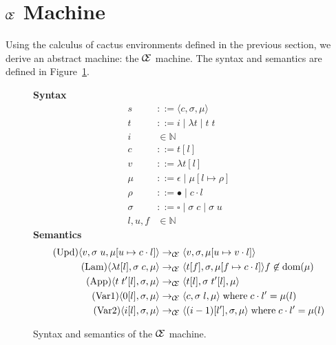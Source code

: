 \section{$\mathcal{\mathcal{C} \mskip -4mu \mathcal{E}}$ Machine} \label{sec:mach}

Using the calculus of cactus environments defined in the previous section, we
derive an abstract machine: the $\mathcal{\mathcal{C} \mskip -4mu \mathcal{E}}$ machine. The syntax
and semantics are defined in Figure~\ref{fig:CEM}. 

\begin{figure}
\textbf{Syntax}
\begin{align*}
\tag{State} s &::= \langle c, \sigma, \mu \rangle \\
\tag{Term} t &::= i \; | \; \lambda t \; | \; t \; t  \\
\tag{Variable} i &\in \mathbb{N}  \\
\tag{Closure} c &::= t [l] \\
\tag{Value} v &::= \lambda t[l] \\
\tag{Heap} \mu &::= \epsilon \; | \; \mu [ l \mapsto \rho ] \\
\tag{Environment} \rho &::= \bullet \; | \; c \cdot l \\
\tag{Context} \sigma &::= \square \; | \; \sigma \; c \;  | \; \sigma \; u \\
\tag{Location} l,u,f &\in \mathbb{N}
\end{align*}
\textbf{Semantics}
\begin{align*}
\tag{Upd}
\langle v,  \sigma \; u , \mu[u \mapsto c \cdot l] \rangle 
  &\rightarrow_{\mathcal{\mathcal{C} \mskip -4mu \mathcal{E}}}
\langle v, \sigma, \mu[u \mapsto v \cdot l] \rangle  \\
\tag{Lam}
\langle \lambda t[l], \sigma \; c, \mu \rangle 
  &\rightarrow_{\mathcal{\mathcal{C} \mskip -4mu \mathcal{E}}}
\langle t[f], \sigma, \mu[f \mapsto c \cdot l]\rangle f \not \in \textnormal{dom}(\mu)  \\
\tag{App}
\langle t \; t'[l], \sigma, \mu \rangle
  &\rightarrow_{\mathcal{\mathcal{C} \mskip -4mu \mathcal{E}}}
\langle t[l], \sigma \; t'[l], \mu \rangle \\
\tag{Var1}
\langle 0[l], \sigma, \mu \rangle
  &\rightarrow_{\mathcal{\mathcal{C} \mskip -4mu \mathcal{E}}}
\langle c, \sigma \; l , \mu \rangle 
\; \textnormal{where} \; c \cdot l' = \mu(l)\\
\tag{Var2}
\langle i[l], \sigma, \mu \rangle
  &\rightarrow_{\mathcal{\mathcal{C} \mskip -4mu \mathcal{E}}}
\langle (i-1)[l'], \sigma, \mu \rangle
\; \textnormal{where} \; c \cdot l' = \mu(l)
\end{align*}
\caption{Syntax and semantics of the $\mathcal{\mathcal{C} \mskip -4mu \mathcal{E}}$ machine.}
\label{fig:CEM}
\end{figure}

